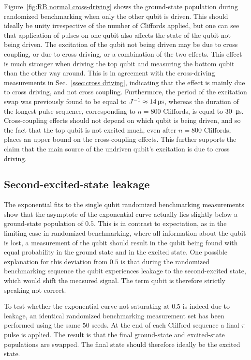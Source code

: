         Figure~\ref{fig:RB normal cross-driving} shows the ground-state population during randomized benchmarking when only the other qubit is driven. This should ideally be unity irrespective of the number of Cliffords applied, but one can see that application of pulses on one qubit also affects the state of the qubit not being driven. The excitation of the qubit not being driven may be due to cross coupling, or due to cross driving, or a combination of the two effects. This effect is much stronger when driving the top qubit and measuring the bottom qubit than the other way around. This is in agreement with the cross-driving measurements in Sec.~\ref{ssec:cross driving}, indicating that the effect is mainly due to cross driving, and not cross coupling. Furthermore, the period of the excitation swap was previously found to be equal to $J^{-1} \approx \text{\ensuremath{\SI{14}{\micro \second}}}$, whereas the duration of the longest pulse sequence, corresponding to $n=800$ Cliffords, is equal to \SI{30}{\micro \second}. Cross-coupling effects should not depend on which qubit is being driven, and so the fact that the top qubit is not excited much, even after $n=800$ Cliffords, places an upper bound on the cross-coupling effects. This further supports the claim that the main source of the undriven qubit's excitation is due to cross driving.

      \subsection{Second-excited-state leakage}
        \label{ssec:Second-excited-state leakage}
        The exponential fits to the single qubit randomized benchmarking measurements show that the asymptote of the exponential curve actually lies slightly below a ground-state population of $0.5$. This is in contrast to expectation, as in the limiting case in randomized benchmarking, where all information about the qubit is lost, a measurement of the qubit should result in the qubit being found with equal probability in the ground state and in the excited state. One possible explanation for this deviation from $0.5$ is that during the randomized benchmarking sequence the qubit experiences leakage to the second-excited state, which would shift the measured signal. The term qubit is therefore strictly speaking not correct.

        To test whether the exponential curve not saturating at $0.5$ is indeed due to leakage, an identical randomized benchmarking measurement set has been performed using the same $50$ seeds. At the end of each Clifford sequence a final $\pi$ pulse is applied. The result is that the final ground-state and excited-state populations are swapped. The final state should therefore ideally be the excited state.

